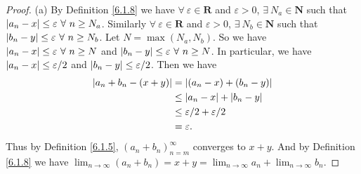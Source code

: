 \begin{proof}{(a)}
    By Definition \ref{6.1.8} we have \(\forall\ \varepsilon \in \mathbf{R}\) and \(\varepsilon > 0\), \(\exists\ N_a \in \mathbf{N}\) such that \(\abs*{a_n - x} \leq \varepsilon \ \forall\ n \geq N_a\).
    Similarly \(\forall\ \varepsilon \in \mathbf{R}\) and \(\varepsilon > 0\), \(\exists\ N_b \in \mathbf{N}\) such that \(\abs*{b_n - y} \leq \varepsilon \ \forall\ n \geq N_b\).
    Let \(N = \max(N_a, N_b)\).
    So we have \(\abs*{a_n - x} \leq \varepsilon \ \forall\ n \geq N\) and \(\abs*{b_n - y} \leq \varepsilon \ \forall\ n \geq N\).
    In particular, we have \(\abs*{a_n - x} \leq \varepsilon / 2\) and \(\abs*{b_n - y} \leq \varepsilon / 2\).
    Then we have
    \begin{align*}
        \abs*{a_n + b_n - (x + y)} & = \abs*{(a_n - x) + (b_n - y)}         \\
                                   & \leq \abs*{a_n - x} + \abs*{b_n - y}   \\
                                   & \leq \varepsilon / 2 + \varepsilon / 2 \\
                                   & = \varepsilon.
    \end{align*}
    Thus by Definition \ref{6.1.5}, \((a_n + b_n)_{n = m}^\infty\) converges to \(x + y\).
    And by Definition \ref{6.1.8} we have \(\lim_{n \to \infty} (a_n + b_n) = x + y = \lim_{n \to \infty} a_n + \lim_{n \to \infty} b_n\).
\end{proof}

